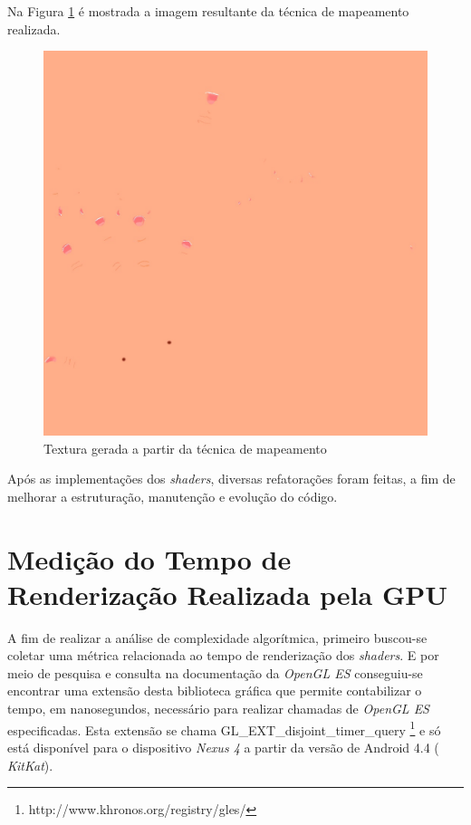 	Na Figura  \ref{texture_uvmap} é mostrada a imagem resultante da técnica de mapeamento realizada.

	\begin{figure}[h]
	\centering
		\includegraphics[keepaspectratio=true,scale=0.2]{figuras/texture_uvmap.jpg}
	\caption{Textura gerada a partir da técnica de mapeamento}
	\label{texture_uvmap}
	\end{figure}

	Após as implementações dos \textit{shaders}, diversas refatorações foram feitas, a fim de melhorar a estruturação, manutenção e evolução do código.  

\section{Medição do Tempo de Renderização Realizada pela GPU}
\label{gpu}

	A fim de realizar a análise de complexidade algorítmica, primeiro buscou-se coletar uma métrica relacionada ao tempo de renderização dos \textit{shaders}. E por meio de pesquisa e consulta na documentação da \textit{OpenGL ES} conseguiu-se encontrar uma extensão desta biblioteca gráfica que permite contabilizar o tempo, em nanosegundos, necessário para realizar chamadas de \textit{OpenGL ES} especificadas. Esta extensão se chama GL\_EXT\_disjoint\_timer\_query \footnote{http://www.khronos.org/registry/gles/} e só está disponível para o dispositivo \textit{Nexus 4} a partir da versão de Android 4.4 ( \textit{KitKat}).

